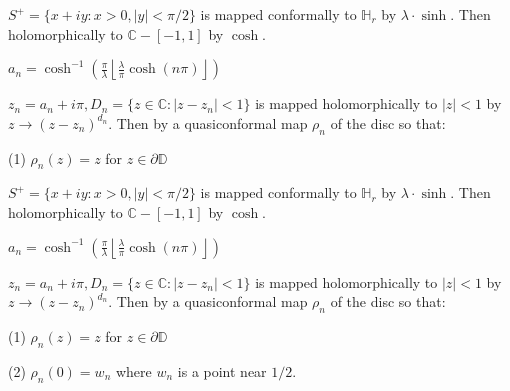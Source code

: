 \documentclass{beamer}
\begin{document}
\begin{frame} 

$S^+ = \{ x + iy : x > 0, |y| < \pi/2 \}$ is mapped conformally to $\mathbb{H}_r$ by $\lambda\cdot\sinh$. Then holomorphically to $\mathbb{C} - [-1,1]$ by $\cosh$.

\vspace{2.5mm}

$a_n = \cosh^{-1}\left( \frac{\pi}{\lambda} \left \lfloor{ \frac{\lambda}{\pi} \cosh(n\pi) }\right \rfloor \right)$

\vspace{2.5mm}

$z_n = a_n + i\pi, D_n = \{ z \in \mathbb{C} : \left| z - z_n \right| < 1\} $ is mapped holomorphically to $|z|<1$ by $z\rightarrow (z - z_n)^{d_n}$. Then by a quasiconformal map $\rho_n$ of the disc so that: 

\hspace{5mm} (1) $\rho_n(z)=z$ for $z\in\partial\mathbb{D}$

\end{frame}





\begin{frame} 

$S^+ = \{ x + iy : x > 0, |y| < \pi/2 \}$ is mapped conformally to $\mathbb{H}_r$ by $\lambda\cdot\sinh$. Then holomorphically to $\mathbb{C} - [-1,1]$ by $\cosh$.

\vspace{2.5mm}

$a_n = \cosh^{-1}\left( \frac{\pi}{\lambda} \left \lfloor{ \frac{\lambda}{\pi} \cosh(n\pi) }\right \rfloor \right)$

\vspace{2.5mm}

$z_n = a_n + i\pi, D_n = \{ z \in \mathbb{C} : \left| z - z_n \right| < 1\} $ is mapped holomorphically to $|z|<1$ by $z\rightarrow (z - z_n)^{d_n}$. Then by a quasiconformal map $\rho_n$ of the disc so that: 

\hspace{5mm} (1) $\rho_n(z)=z$ for $z\in\partial\mathbb{D}$

\hspace{5mm} (2) $\rho_n(0)=w_n$ where $w_n$ is a point near $1/2$.

\end{frame}
\end{document}
